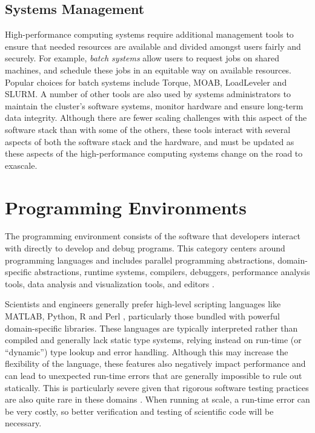 \documentclass[12pt]{article}
\begin{document}
\subsection{Systems Management}
High-performance computing systems require additional management tools to ensure that needed resources are available and divided amongst users fairly and securely. For example, {\it batch systems} allow users to request jobs on shared machines, and schedule these jobs in an equitable way on available resources. Popular choices for batch systems  include Torque, MOAB, LoadLeveler and SLURM. A number of other tools are also used by systems administrators to maintain the cluster's software systems, monitor hardware and ensure long-term data integrity. Although there are fewer scaling challenges with this aspect of the software stack than with some of the others, these tools interact with several aspects of both the software stack and the hardware, and must be updated as these aspects of the high-performance computing systems change on the road to exascale.

\section{Programming Environments}
The programming environment consists of the software that developers interact with directly to develop and debug programs. This category centers around programming languages and includes parallel programming abstractions, domain-specific abstractions, runtime systems, compilers, debuggers, performance analysis tools, data analysis and visualization tools, and editors \cite{exascale-roadmap}.

Scientists and engineers generally prefer high-level scripting languages like MATLAB, Python, R and Perl \cite{nguyen2010survey}, particularly those bundled with powerful domain-specific libraries. These languages are typically interpreted rather than compiled and generally lack static type systems, relying instead on run-time (or ``dynamic'') type lookup and error handling. Although this may increase the flexibility of the language, these features also negatively impact performance and can lead to unexpected run-time errors that are generally impossible to rule out statically. This is particularly severe given that rigorous software testing practices are also quite rare in these domains \cite{nguyen2010survey}. When running at scale, a run-time error can be very costly, so better verification and testing of scientific code will be necessary.
\end{document}
